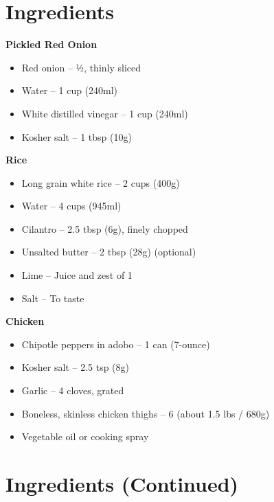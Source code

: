 




\section*{Ingredients}

\textbf{Pickled Red Onion}
\begin{itemize}
    \item[\cut] Red onion – ½, thinly sliced
    \item[\measure] Water – 1 cup (240ml)
    \item[\measure] White distilled vinegar – 1 cup (240ml)
    \item[\measure] Kosher salt – 1 tbsp (10g)
\end{itemize}

\textbf{Rice}
\begin{itemize}
    \item Long grain white rice – 2 cups (400g)
    \item[\measure] Water – 4 cups (945ml)
    \item[\cut] Cilantro – 2.5 tbsp (6g), finely chopped
    \item Unsalted butter – 2 tbsp (28g) (optional)
    \item[\cut] Lime – Juice and zest of 1
    \item Salt – To taste
\end{itemize}

\textbf{Chicken}
\begin{itemize}
    \item[\cut] Chipotle peppers in adobo – 1 can (7-ounce)
    \item[\measure] Kosher salt – 2.5 tsp (8g)
    \item[\cut] Garlic – 4 cloves, grated
    \item Boneless, skinless chicken thighs – 6 (about 1.5 lbs / 680g)
    \item Vegetable oil or cooking spray
\end{itemize}

\newpage

\section*{Ingredients (Continued)}


